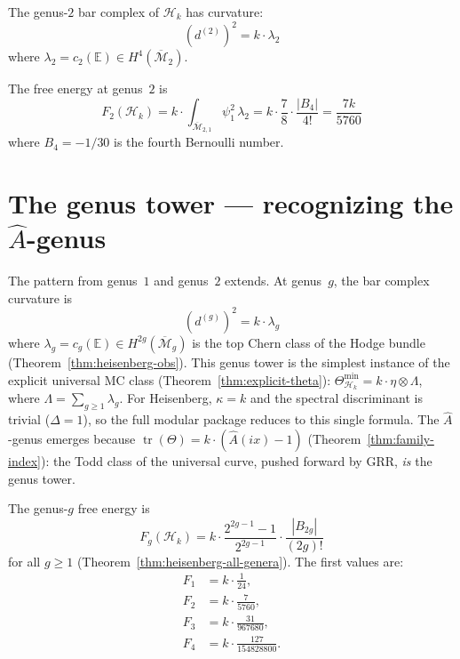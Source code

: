 \begin{theorem}\label{thm:frame-genus2-curvature}
The genus-$2$ bar complex of $\mathcal{H}_k$ has curvature:
\begin{equation}\label{eq:frame-genus2-curvature}
(d^{(2)})^2 = k \cdot \lambda_2
\end{equation}
where $\lambda_2 = c_2(\mathbb{E}) \in H^4(\overline{\mathcal{M}}_2)$.
\end{theorem}

The free energy at genus~$2$ is
\begin{equation}\label{eq:frame-F2}
F_2(\mathcal{H}_k) = k \cdot
\int_{\overline{\mathcal{M}}_{2,1}} \psi_1^2\, \lambda_2
= k \cdot \frac{7}{8} \cdot \frac{|B_4|}{4!}
= \frac{7k}{5760}
\end{equation}
where $B_4 = -1/30$ is the fourth Bernoulli number.

\section{\texorpdfstring{The genus tower --- recognizing the $\hat{A}$-genus}{The genus tower --- recognizing the A-hat genus}}
\label{sec:frame-genus-tower}

The pattern from genus~$1$ and genus~$2$ extends.  At genus~$g$,
the bar complex curvature is
\begin{equation}\label{eq:frame-genus-g-curvature}
(d^{(g)})^2 = k \cdot \lambda_g
\end{equation}
where $\lambda_g = c_g(\mathbb{E}) \in H^{2g}(\overline{\mathcal{M}}_g)$
is the top Chern class of the Hodge bundle
(Theorem~\ref{thm:heisenberg-obs}).
This genus tower is the simplest instance of the explicit universal
MC class (Theorem~\ref{thm:explicit-theta}):
$\Theta_{\mathcal{H}_k}^{\min} = k \cdot \eta \otimes \Lambda$,
where $\Lambda = \sum_{g \geq 1}\lambda_g$.
For Heisenberg, $\kappa = k$ and the spectral discriminant is trivial
($\Delta = 1$), so the full modular package reduces to this single
formula.  The $\hat{A}$-genus emerges because
$\operatorname{tr}(\Theta) = k \cdot (\hat{A}(ix) - 1)$
(Theorem~\ref{thm:family-index}): the Todd class of the universal
curve, pushed forward by GRR, \emph{is} the genus tower.

The genus-$g$ free energy is
\begin{equation}\label{eq:frame-Fg}
F_g(\mathcal{H}_k) = k \cdot
\frac{2^{2g-1}-1}{2^{2g-1}} \cdot \frac{|B_{2g}|}{(2g)!}
\end{equation}
for all $g \geq 1$ (Theorem~\ref{thm:heisenberg-all-genera}).
The first values are:
\begin{align}
F_1 &= k \cdot \frac{1}{24}, \label{eq:frame-F1} \\
F_2 &= k \cdot \frac{7}{5760}, \label{eq:frame-F2-repeat} \\
F_3 &= k \cdot \frac{31}{967680}, \label{eq:frame-F3} \\
F_4 &= k \cdot \frac{127}{154828800}. \label{eq:frame-F4}
\end{align}

